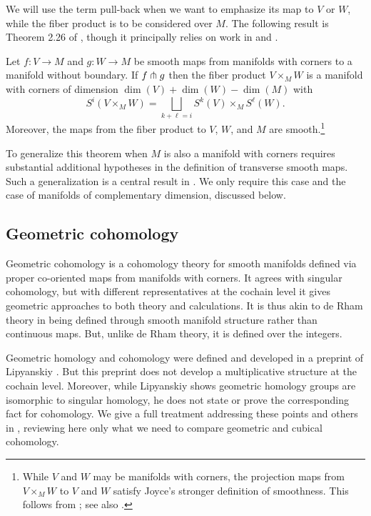 We will use the term pull-back when we want to emphasize its map to $V$ or $W$, while the fiber product is to be considered over $M$.
The following result is Theorem 2.26 of \cite{medina2022foundations}, though it principally relies on work in \cite{Joy12} and \cite{MaDo92}.

\begin{theorem}\label{pullback}
	Let $f \colon V \to M$ and $g \colon W \to M$ be smooth maps from manifolds with corners to a manifold without boundary.
	If $f \pitchfork g$ then the fiber product $V \times_M W$ is a manifold with corners of dimension $\dim(V) + \dim(W) - \dim(M)$ with
	\begin{equation*}
		S^i(V \times_M W) = \bigsqcup_{k + \ell = i} S^k(V) \times_M S^\ell(W).
	\end{equation*}
	Moreover, the maps from the fiber product to $V$, $W$, and $M$ are smooth.\footnote{While $V$ and $W$ may be manifolds with corners, the projection maps from $V \times_M W$ to $V$ and $W$ satisfy Joyce's stronger definition of smoothness.
	This follows from \cite[Theorem 6.4]{Joy12}; see also \cite[Theorem 2.26]{medina2022foundations}.}
\end{theorem}

To generalize this theorem when $M$ is also a manifold with corners requires substantial additional hypotheses in the definition of transverse smooth maps.
Such a generalization is a central result in \cite{Joy12}. We only require this case and the case of manifolds of complementary dimension, discussed below.

\subsection{Geometric cohomology}

Geometric cohomology is a cohomology theory for smooth manifolds defined via proper co-oriented maps from manifolds with corners.
It agrees with singular cohomology, but with different representatives at the cochain level it gives geometric approaches to both theory and calculations.
It is thus akin to de Rham theory in being defined through smooth manifold structure rather than continuous maps.
But, unlike de Rham theory, it is defined over the integers.

Geometric homology and cohomology were defined and developed in a preprint of Lipyanskiy \cite{Lipy14}.
But this preprint does not develop a multiplicative structure at the cochain level.
Moreover, while Lipyanskiy shows geometric homology groups are isomorphic to singular homology, he does not state or prove the corresponding fact for cohomology.
We give a full treatment addressing these points and others in \cite{medina2022foundations}, reviewing here only what we need to compare geometric and cubical cohomology.

